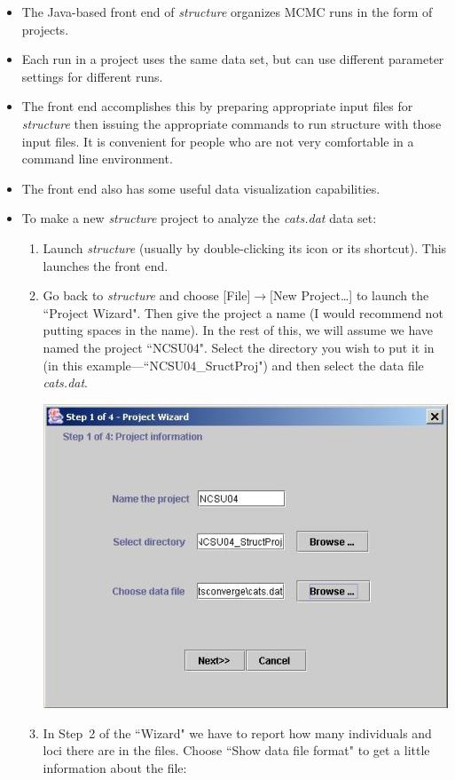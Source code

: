 \begin{itemize}
\item The Java-based front end of {\em structure} organizes MCMC runs in the form of projects.  
\item Each run in a project uses the same data set, but can use different parameter settings for different runs.  
\item The front end accomplishes this by preparing appropriate input files for {\em structure} then issuing the appropriate commands to run structure with those input files. It is convenient for people who are not very comfortable in a command line environment.  
\item The front end also has some useful data visualization capabilities.  
\item To make a new {\em structure} project to analyze the {\em cats.dat} data set:
\begin{enumerate}
\item Launch {\em structure} (usually by double-clicking its icon or its shortcut).  This launches the front end.
\item Go back to {\em structure} and choose [File]$\rightarrow$[New Project\ldots] to launch the ``Project Wizard".  Then give the project a name (I would recommend not putting spaces in the name).  In the rest of this, we will assume we have named the project ``NCSU04".  Select the directory you wish to put it in (in this example---``NCSU04\_SructProj") and then select the data file {\sl cats.dat}.
\begin{center}
\includegraphics[width=.56\textwidth]{illus/projsetup.jpg}
\end{center}
\item In Step~2 of the ``Wizard" we have to report how many individuals and loci there are in the files.  Choose ``Show data file format" to get a little information about the file:
\begin{center}

\end{center}
\end{enumerate}
\end{itemize}
